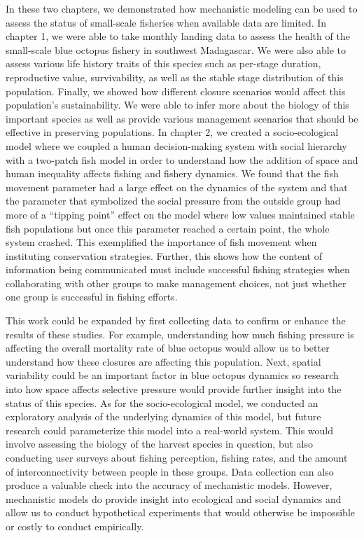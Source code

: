 \documentclass[
]{article}
\begin{document}
In these two chapters, we demonstrated how mechanistic modeling can be used to assess the status of small-scale fisheries when available data are limited. In chapter 1, we were able to take monthly landing data to assess the health of the small-scale blue octopus fishery in southwest Madagascar. We were also able to assess various life history traits of this species such as per-stage duration, reproductive value, survivability, as well as the stable stage distribution of this population. Finally, we showed how different closure scenarios would affect this population's sustainability. We were able to infer more about the biology of this important species as well as provide various management scenarios that should be effective in preserving populations. In chapter 2, we created a socio-ecological model where we coupled a human decision-making system with social hierarchy with a two-patch fish model in order to understand how the addition of space and human inequality affects fishing and fishery dynamics. We found that the fish movement parameter had a large effect on the dynamics of the system and that the parameter that symbolized the social pressure from the outside group had more of a ``tipping point'' effect on the model where low values maintained stable fish populations but once this parameter reached a certain point, the whole system crashed. This exemplified the importance of fish movement when instituting conservation strategies. Further, this shows how the content of information being communicated must include successful fishing strategies when collaborating with other groups to make management choices, not just whether one group is successful in fishing efforts.

This work could be expanded by first collecting data to confirm or enhance the results of these studies. For example, understanding how much fishing pressure is affecting the overall mortality rate of blue octopus would allow us to better understand how these closures are affecting this population. Next, spatial variability could be an important factor in blue octopus dynamics so research into how space affects selective pressure would provide further insight into the status of this species. As for the socio-ecological model, we conducted an exploratory analysis of the underlying dynamics of this model, but future research could parameterize this model into a real-world system. This would involve assessing the biology of the harvest species in question, but also conducting user surveys about fishing perception, fishing rates, and the amount of interconnectivity between people in these groups. Data collection can also produce a valuable check into the accuracy of mechanistic models. However, mechanistic models do provide insight into ecological and social dynamics and allow us to conduct hypothetical experiments that would otherwise be impossible or costly to conduct empirically.
\end{document}
